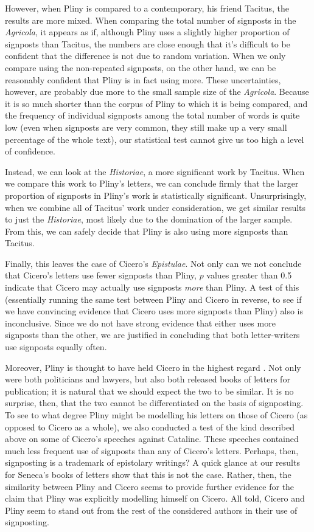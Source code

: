 However, when Pliny is compared to a contemporary, his friend Tacitus, the results are more mixed. When comparing the total number of signposts in the \textit{Agricola}, it appears as if, although Pliny uses a slightly higher proportion of signposts than Tacitus, the numbers are close enough that it's difficult to be confident that the difference is not due to random variation. When we only compare using the non-repeated signposts, on the other hand, we can be reasonably confident that Pliny is in fact using more. These uncertainties, however, are probably due more to the small sample size of the \textit{Agricola}. Because it is so much shorter than the corpus of Pliny to which it is being compared, and the frequency of individual signposts among the total number of words is quite low (even when signposts are very common, they still make up a very small percentage of the whole text), our statistical test cannot give us too high a level of confidence. 

Instead, we can look at the \textit{Historiae}, a more significant work by Tacitus. When we compare this work to Pliny's letters, we can conclude firmly that the larger proportion of signposts in Pliny's work is statistically significant. Unsurprisingly, when we combine all of Tacitus' work under consideration, we get similar results to just the \textit{Historiae}, most likely due to the domination of the larger sample. From this, we can safely decide that Pliny is also using more signposts than Tacitus.

Finally, this leaves the case of Cicero's \textit{Epistulae}. Not only can we not conclude that Cicero's letters use fewer signposts than Pliny, $p$ values greater than 0.5 indicate that Cicero may actually use signposts \textit{more} than Pliny. A test of this (essentially running the same test between Pliny and Cicero in reverse, to see if we have convincing evidence that Cicero uses more signposts than Pliny) also is inconclusive. Since we do not have strong evidence that either uses more signposts than the other, we are justified in concluding that both letter-writers use signposts equally often. 

Moreover, Pliny is thought to have held Cicero in the highest regard \cite{plinycicero1} \cite{plinycicero2}. Not only were both politicians and lawyers, but also both released books of letters for publication; it is natural that we should expect the two to be similar. It is no surprise, then, that the two cannot be differentiated on the basis of signposting. To see to what degree Pliny might be modelling his letters on those of Cicero (as opposed to Cicero as a whole), we also conducted a test of the kind described above on some of Cicero's speeches against Cataline. These speeches contained much less frequent use of signposts than any of Cicero's letters. Perhaps, then, signposting is a trademark of epistolary writings? A quick glance at our results for Seneca's books of letters show that this is not the case. Rather, then, the similarity between Pliny and Cicero seems to provide further evidence for the claim that Pliny was explicitly modelling himself on Cicero. All told, Cicero and Pliny seem to stand out from the rest of the considered authors in their use of signposting.
